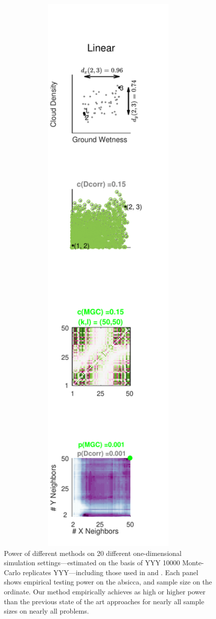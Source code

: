 \documentclass[11pt]{article}
\begin{document}
\begin{figure}[htbp]
\includegraphics[width=1.0\textwidth]{../Figures/Fig1}
\caption{
Power of different methods on 20 different one-dimensional simulation settings---estimated on the basis of YYY 10000 Monte-Carlo replicates YYY---including those used in \cite{HellerGorfine2013} and \cite{Reshef2011}. 
Each panel shows empirical testing power on the absicca, and sample size on the ordinate.
Our method empirically achieves as high or higher power than the previous state of the art approaches for nearly all sample sizes on nearly all problems.}
\label{fig:1D}
\end{figure}
\end{document}
